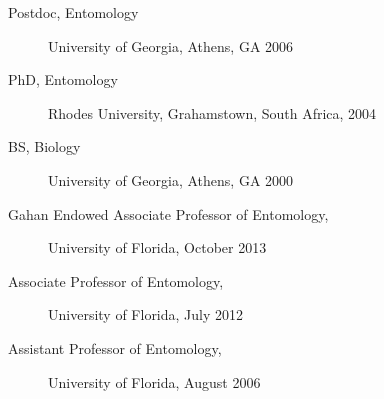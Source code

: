 


\begin{description}
\item[Postdoc, Entomology] University of Georgia, Athens, GA 2006
\item[PhD, Entomology] Rhodes University, Grahamstown, South Africa, 2004
\item[BS, Biology] University of Georgia, Athens, GA 2000
\end{description}

\begin{description}
\item[Gahan Endowed Associate Professor of Entomology,] University of Florida, October 2013
\item[Associate Professor of Entomology,] University of Florida, July 2012
\item[Assistant Professor of Entomology,] University of Florida, August 2006
\end{description}



